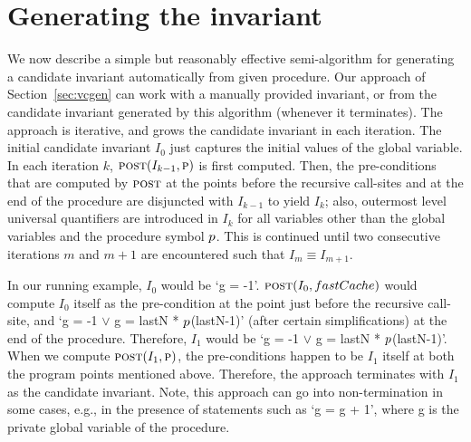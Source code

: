 \section{Generating the invariant}
\label{sec:invariant}

We now describe a simple but reasonably effective semi-algorithm for
generating a candidate invariant automatically from given procedure. Our
approach of Section~\ref{sec:vcgen} can work with a manually provided
invariant, or from the candidate invariant generated by this algorithm
(whenever it terminates). The approach is iterative, and grows the
candidate invariant in each iteration. The initial candidate invariant
$I_0$ just captures the initial values of the global variable. In each
iteration $k$, $\textsc{post}(I_{k-1}, \textsc{p})$ is first computed. Then, the
pre-conditions that are computed by $\textsc{post}$ at the points before the
recursive call-sites and at the end of the procedure are disjuncted with
$I_{k-1}$ to yield $I_k$; also, outermost level universal quantifiers are
introduced in $I_k$ for all variables other than the global variables and
the procedure symbol $p$.  This is continued until two consecutive
iterations $m$ and $m+1$ are encountered such that $I_m \equiv I_{m+1}$.

In our running example, $I_0$ would be `g = -1'. $\textsc{post}(I_0, fastCache)$
would compute $I_0$ itself as the pre-condition at the point just before
the recursive call-site, and `g = -1 $\vee$ g = lastN *
$p$(lastN-1)' (after certain simplifications) at the end of the
procedure. Therefore, $I_1$ would be `g = -1 $\vee$ g = lastN *
$p$(lastN-1)'. When we compute $\textsc{post}(I_1, \textsc{p})$, the
pre-conditions happen to be $I_1$ itself at both the program points
mentioned above. Therefore, the approach terminates with $I_1$ as the
candidate invariant. Note, this approach can go into non-termination in
some cases, e.g.,
in the presence of statements such as `g = g + 1', where g is the private
global variable of the procedure.
